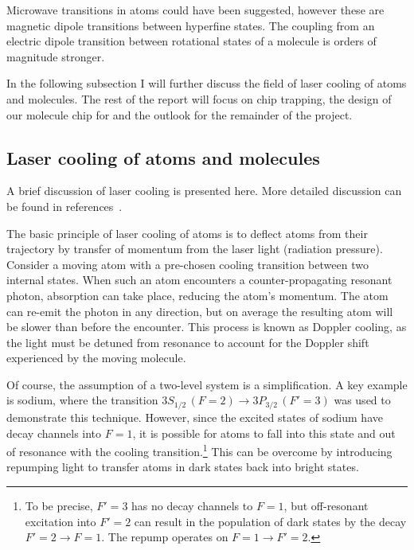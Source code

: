 Microwave transitions in atoms could have been suggested, however these are
magnetic dipole transitions between hyperfine states. The coupling from an
electric dipole transition between rotational states of a molecule is orders of
magnitude stronger. 

In the following subsection I will further discuss the field of laser cooling of
atoms and molecules. The rest of the report will focus on chip trapping, the
design of our molecule chip for \CaF{} and the outlook for the remainder of the
project.

\subsection{Laser cooling of atoms and molecules}
\label{intro:lasercool}

A brief discussion of laser cooling is presented here. More detailed discussion
can be found in references~\cite{Metcalf1999,RevModPhys.70.721,McCarron_2018}.

The basic principle of laser cooling of atoms is to deflect atoms from their
trajectory by transfer of momentum from the laser light (radiation
pressure).~\cite{RevModPhys.70.721} Consider a moving atom with a
pre-chosen cooling transition between two internal states.  When such an atom
encounters a counter-propagating resonant photon, absorption can take place,
reducing the atom's momentum. The atom can re-emit the photon in any direction,
but on average the resulting atom will be slower than before the encounter.
This process is known as Doppler cooling, as the light must be detuned from
resonance to account for the Doppler shift experienced by the moving
molecule.~\cite{Metcalf1999}

Of course, the assumption of a two-level system is a simplification. A key
example is sodium, where the transition $3S_{1/2}\, (F=2) \rightarrow 3P_{3/2}\,
(F'=3)$ was used to demonstrate this technique. However, since the excited
states of sodium have decay channels into $F=1$, it is possible for atoms to
fall into this state and out of resonance with the cooling
transition.\footnote{To be precise, $F'=3$ has no decay channels to $F=1$, but
off-resonant excitation into $F'=2$ can result in the population of dark states
by the decay $F'=2 \rightarrow F=1$. The repump operates on $F=1\rightarrow
F'=2$.} This can be overcome by introducing repumping light to transfer atoms in
dark states back into bright states.~\cite{RevModPhys.70.721} 

